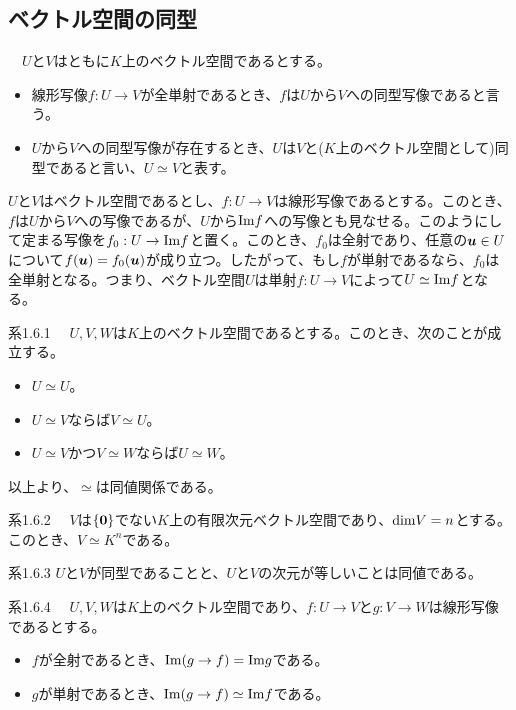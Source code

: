 \documentclass[dvipdfmx, 9pt, a4paper]{jsarticle}
\numberwithin{equation}{subsection}
\newcommand{\bm}[1]{{\mbox{\boldmath $#1$}}}
\begin{document}
\subsection{ベクトル空間の同型}
\begin{tcolorbox}[title=同型写像と同型]
　$U$と$V$はともに$K$上のベクトル空間であるとする。
\begin{itemize}
\item 線形写像$f:U \to V$が全単射であるとき、$f$は$U$から$V$への同型写像であると言う。
\item $U$から$V$への同型写像が存在するとき、$U$は$V$と($K$上のベクトル空間として)同型であると言い、$U \simeq V$と表す。
\end{itemize}
\end{tcolorbox}\par
$U$と$V$はベクトル空間であるとし、$f:U \to V$は線形写像であるとする。このとき、$f$は$U$から$V$への写像であるが、$U$から${\rm Im}f$への写像とも見なせる。このようにして定まる写像を$f_0:U \to {\rm Im}f$と置く。このとき、$f_0$は全射であり、任意の$\bm u \in U$について$f(\bm u)=f_0(\bm u)$が成り立つ。したがって、もし$f$が単射であるなら、$f_0$は全単射となる。つまり、ベクトル空間$U$は単射$f:U \to V$によって$U \simeq {\rm Im}f$となる。
\begin{itembox}[l]{系1.6.1}
　$U, V, W$は$K$上のベクトル空間であるとする。このとき、次のことが成立する。
\begin{itemize}
\item $U \simeq U$。
\item $U \simeq V$ならば$V \simeq U$。
\item $U \simeq V$かつ$V \simeq W$ならば$U \simeq W$。
\end{itemize}
\end{itembox}\par
以上より、$\simeq$は同値関係である。
\begin{itembox}[l]{系1.6.2}
　$V$は$\{ \bm 0 \}$でない$K$上の有限次元ベクトル空間であり、${\rm dim}V=n$とする。このとき、$V \simeq K^n$である。
\end{itembox}
\begin{itembox}[l]{系1.6.3}
 $U$と$V$が同型であることと、$U$と$V$の次元が等しいことは同値である。
\end{itembox}
\begin{itembox}[l]{系1.6.4}
　$U, V, W$は$K$上のベクトル空間であり、$f:U \to V$と$g:V \to W$は線形写像であるとする。
\begin{itemize}
\item $f$が全射であるとき、${\rm Im}(g \to f)={\rm Im}g$である。
\item $g$が単射であるとき、${\rm Im}(g \to f) \simeq {\rm Im}f$である。
\end{itemize}
\end{itembox}
\end{document}
